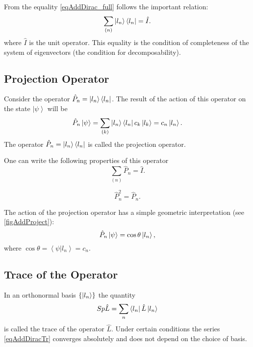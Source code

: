 From the equality \ref{eqAddDirac_full} follows the important relation:
\begin{equation}  
\sum_{(n)} \ket{ l_n } \bra{ l_n } = \hat{I}.
\label{eqAddDiracI}
\end{equation}  
where $\hat{I}$ is the unit operator. This equality is the condition
of completeness of the system of eigenvectors (the condition for decomposability). 

\subsection{Projection Operator}
\label{AddDiracProjector}

Consider the operator \(\hat{P}_n = \ket{ l_n } \left< l_n
\right|\). 
The result of the action of this operator on the state 
\(\left| \psi \right>\) will be
\begin{equation}
\hat{P}_n \left| \psi \right> = \sum_{(k)} \ket{ l_n } \left<
l_n \right| c_k \ket{ l_k } = c_n \ket{ l_n }.
\label{eqDiracProektor}
\end{equation}
The operator \(\hat{P}_n = \ket{ l_n } \bra{ l_n }\) is called
the projection operator.

One can write the following properties of this operator
\begin{equation}  
\sum_{(n)} \hat{P}_n = \hat{I}.
\end{equation}  

\begin{equation}  
\hat{P}_n^2 = \hat{P}_n.
\end{equation}  


The action of the projection operator has a simple geometric
interpretation (see \autoref{figAddProject}):
\[
\hat{P}_n\left|\psi\right> = \cos{\theta} \ket{l_n},
\]
where $\cos{\theta} = \left<\psi|l_n\right> = c_n$. 

\subsection{Trace of the Operator}
\label{AddDiracTrace}
In an orthonormal basis \(\left\{\ket{l_n}\right\}\) 
the quantity 
\begin{equation}  
Sp \hat{L} = \sum_n \bra{l_n} \hat{L} \ket{l_n}
\label{eqAddDiracTr}
\end{equation}  
is called the trace of the operator \(\hat{L}\). Under certain conditions
\cite{bTraceClassOperatorAdd1} the series \ref{eqAddDiracTr}
converges absolutely and does not depend on the choice of basis.

